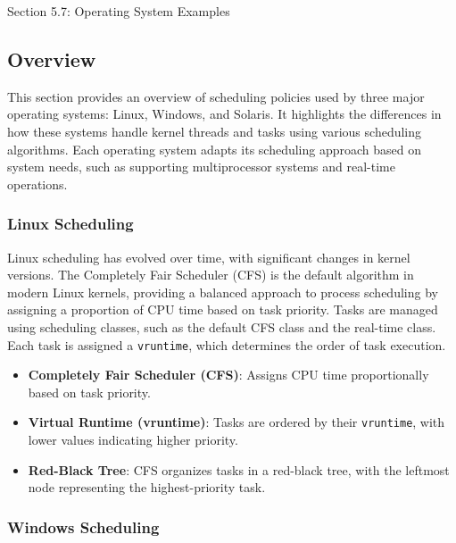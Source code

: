 \begin{notes}{Section 5.7: Operating System Examples}
    \subsection*{Overview}

    This section provides an overview of scheduling policies used by three major operating systems: Linux, Windows, and Solaris. It highlights the differences in how these systems handle kernel threads 
    and tasks using various scheduling algorithms. Each operating system adapts its scheduling approach based on system needs, such as supporting multiprocessor systems and real-time operations.
    
    \subsubsection*{Linux Scheduling}
    
    Linux scheduling has evolved over time, with significant changes in kernel versions. The Completely Fair Scheduler (CFS) is the default algorithm in modern Linux kernels, providing a balanced approach 
    to process scheduling by assigning a proportion of CPU time based on task priority. Tasks are managed using scheduling classes, such as the default CFS class and the real-time class. Each task is 
    assigned a \texttt{vruntime}, which determines the order of task execution.
    
    \begin{highlight}
    
        \begin{itemize}
            \item \textbf{Completely Fair Scheduler (CFS)}: Assigns CPU time proportionally based on task priority.
            \item \textbf{Virtual Runtime (vruntime)}: Tasks are ordered by their \texttt{vruntime}, with lower values indicating higher priority.
            \item \textbf{Red-Black Tree}: CFS organizes tasks in a red-black tree, with the leftmost node representing the highest-priority task.
        \end{itemize}
    
    \end{highlight}
    
    \subsubsection*{Windows Scheduling}
    

\end{notes}
